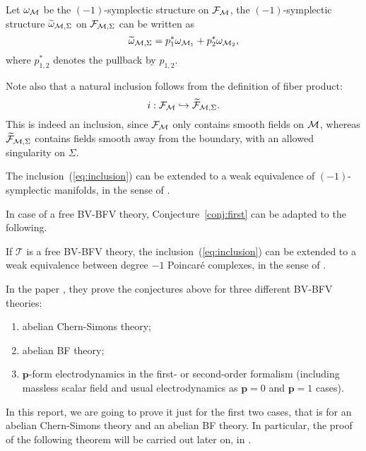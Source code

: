 Let $\omega_{\mathcal{M}}$ be the $(-1)$-symplectic structure on $\mathcal{F}_{\mathcal{M}}$, the $(-1)$-symplectic structure $\widetilde{\omega}_{\mathcal{M},\Sigma}$ on $\mathcal{F}_{\mathcal{M},\Sigma}$ can be written as
\begin{equation}
\label{eq:wt_omega}
    \widetilde{\omega}_{\mathcal{M},\Sigma} = 
    p_1^* \omega_{\mathcal{M}_1} + p_2^* \omega_{\mathcal{M}_2} ,
\end{equation}
where $p_{1,2}^*$ denotes the pullback by $p_{1,2}$.

Note also that a natural inclusion follows from the definition of fiber product:
\begin{equation}
\label{eq:inclusion}
    i : \mathcal{F}_{\mathcal{M}} \hookrightarrow \widetilde{\mathcal{F}}_{\mathcal{M},\Sigma} .
\end{equation}
This is indeed an inclusion, since $\mathcal{F}_{\mathcal{M}}$ only contains smooth fields on $\mathcal{M}$, whereas $\widetilde{\mathcal{F}}_{\mathcal{M}, \Sigma}$ contains fields smooth away from the boundary, with an allowed singularity on $\Sigma$.

\begin{conj}
\label{conj:first}
    The inclusion~(\ref{eq:inclusion}) can be extended to a weak equivalence of $(-1)$-symplectic manifolds, in the sense of .
\end{conj}

In case of a free BV-BFV theory, Conjecture~\ref{conj:first} can be adapted to the following.

\begin{conj}
\label{conj:second}
    If $\mathcal{T}$ is a free BV-BFV theory, the inclusion~(\ref{eq:inclusion}) can be extended to a weak equivalence between degree $-1$ Poincaré complexes, in the sense of .
\end{conj}

In the paper \cite{Gluing_BV-BFV}, they prove the conjectures above for three different BV-BFV theories:
\begin{enumerate}[label={\arabic*)}]
    \item abelian Chern-Simons theory;
    \item abelian BF theory;
    \item $\mathbf{p}$-form electrodynamics in the first- or second-order formalism (including massless scalar field and usual electrodynamics as $\mathbf{p} = 0$ and $\mathbf{p} = 1$ cases).
\end{enumerate}

In this report, we are going to prove it just for the first two cases, that is for an abelian Chern-Simons theory and an abelian BF theory.
In particular, the proof of the following theorem will be carried out later on, in .

